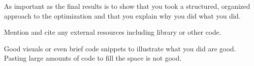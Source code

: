 As important as the final results is to show that you took a structured, organized approach to the optimization and that you explain why you did what you did.

Mention and cite any external resources including library or other code.

Good visuals or even brief code snippets to illustrate what you did are good. Pasting large amounts of code to fill the space is not good.